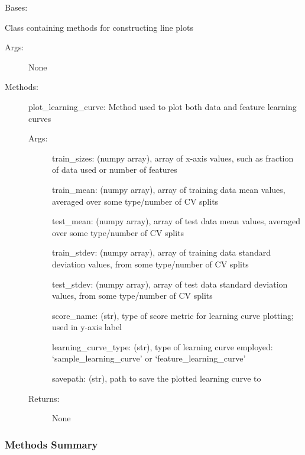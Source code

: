 \documentclass[letterpaper,10pt,english]{sphinxmanual}
\begin{document}
\begin{fulllineitems}
\label{\detokenize{api/mastml.plots.Line:mastml.plots.Line}}
Bases: 

Class containing methods for constructing line plots
\begin{description}
\item[{Args:}] \leavevmode
None

\item[{Methods:}] \leavevmode
plot\_learning\_curve: Method used to plot both data and feature learning curves
\begin{description}
\item[{Args:}] \leavevmode
train\_sizes: (numpy array), array of x-axis values, such as fraction of data used or number of features

train\_mean: (numpy array), array of training data mean values, averaged over some type/number of CV splits

test\_mean: (numpy array), array of test data mean values, averaged over some type/number of CV splits

train\_stdev: (numpy array), array of training data standard deviation values, from some type/number of CV splits

test\_stdev: (numpy array), array of test data standard deviation values, from some type/number of CV splits

score\_name: (str), type of score metric for learning curve plotting; used in y-axis label

learning\_curve\_type: (str), type of learning curve employed: ‘sample\_learning\_curve’ or ‘feature\_learning\_curve’

savepath: (str), path to save the plotted learning curve to

\item[{Returns:}] \leavevmode
None

\end{description}

\end{description}
\subsubsection*{Methods Summary}


\begin{savenotes}\sphinxatlongtablestart\begin{longtable}[c]{}
\hline


\end{longtable}
\end{savenotes}
\end{fulllineitems}
\end{document}
